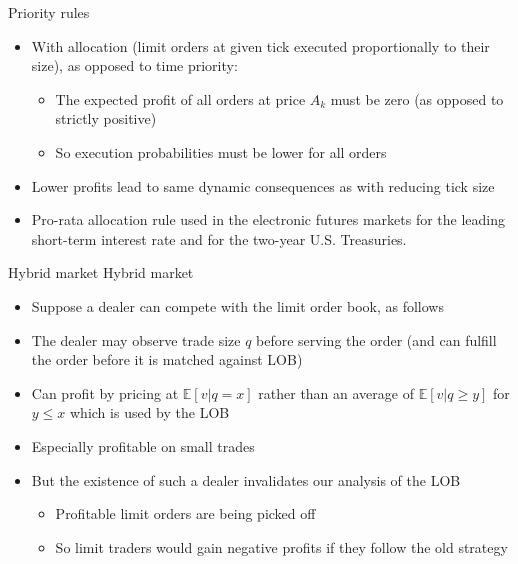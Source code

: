 \documentclass[english,10pt
,aspectratio=169
]{beamer}
\begin{document}
\begin{frame}{Priority rules}
	\begin{itemize}
		\item With  allocation (limit orders at given tick executed proportionally to their size), as opposed to \alert{time priority}:
		\begin{itemize}
			\item The expected profit of all orders at price $A_k$ must be zero (as opposed to strictly positive)
			\item So execution probabilities must be lower for all orders
		\end{itemize}
		\item Lower profits lead to same dynamic consequences as with reducing tick size
		\item Pro-rata allocation rule used in the electronic futures markets for the leading short-term interest rate and for the two-year U.S. Treasuries.
	\end{itemize}
\end{frame}


\begin{frame}{Hybrid market}
	Hybrid market
	\begin{itemize}
		\item Suppose a dealer can compete with the limit order book, as follows
		\item The dealer may observe trade size $q$ before serving the order (and can fulfill the order before it is matched against LOB)
		\item Can profit by pricing at $\mathbb{E}[v|q=x]$ rather than an average of $\mathbb{E}[v|q \geq y]$ for $y \leq x$ which is used by the LOB
		\item Especially profitable on small trades
		\item But the existence of such a dealer invalidates our analysis of the LOB
		\begin{itemize}
			\item Profitable limit orders are being picked off
			\item So limit traders would gain negative profits if they follow the old strategy
		\end{itemize}
	\end{itemize}
\end{frame}
\end{document}
